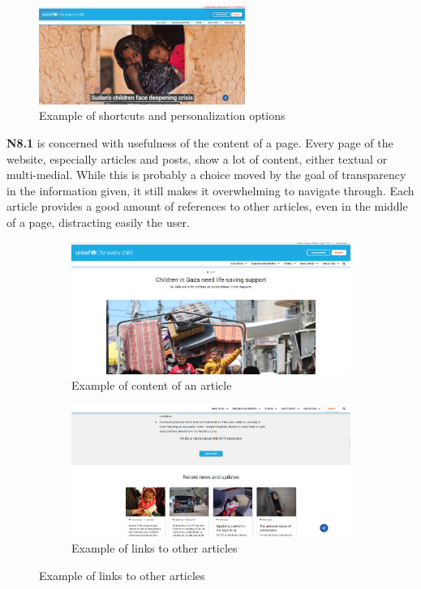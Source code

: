 \begin{figure}[h]
	\centering
	\includegraphics[width=0.6\textwidth]{img/critical_heuristics/N7.1 N7.2.png}
	\caption{Example of shortcuts and personalization options}
	\label{fig:N7.1 N7.2}
\end{figure}

\textbf{N8.1} is concerned with usefulness of the content of a page. Every page of the website, especially articles and posts, show a lot of content, either textual or multi-medial.
While this is probably a choice moved by the goal of transparency in the information given, it still makes it overwhelming to navigate through. Each article provides a good amount of
references to other articles, even in the middle of a page, distracting easily the user.

\begin{figure}[h]
    \centering
	\begin{subfigure}[b]{0.48\textwidth}
        \centering
        \includegraphics[width=\textwidth]{img/critical_heuristics/N8.1a.png}
        \caption{Example of content of an article}
        \label{fig:N8.1a}
    \end{subfigure}
    \hfill
    \begin{subfigure}[b]{0.48\textwidth}
        \centering
        \includegraphics[width=\textwidth]{img/critical_heuristics/N8.1b.png}
        \caption{Example of links to other articles}
        \label{fig:N8.1b}
    \end{subfigure}
\end{figure}

